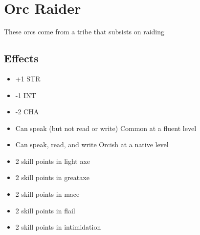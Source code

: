 \section{Orc Raider}\label{culture:orc-raider}
These orcs come from a tribe that subsists on raiding

\subsection{Effects}
\begin{itemize}
    \item +1 STR
    \item -1 INT
    \item -2 CHA
    \item Can speak (but not read or write) Common at a fluent level
    \item Can speak, read, and write Orcish at a native level
    \item 2 skill points in light axe
    \item 2 skill points in greataxe
    \item 2 skill points in mace
    \item 2 skill points in flail
    \item 2 skill points in intimidation
\end{itemize}
